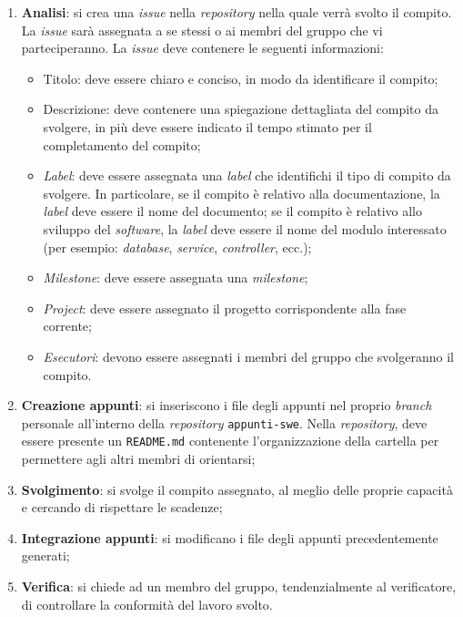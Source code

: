 \begin{enumerate}
	\item \textbf{Analisi}: si crea una \textit{issue\g} nella
	      \textit{repository\g} nella quale verrà svolto il compito. La
	      \textit{issue\g} sarà assegnata a se stessi o ai membri del gruppo che
	      vi parteciperanno. La \textit{issue\g} deve contenere le seguenti
	      informazioni:
	      \begin{itemize}
		      \item Titolo: deve essere chiaro e conciso, in modo da
		            identificare il compito;

		      \item Descrizione: deve contenere una spiegazione dettagliata
		            del compito da svolgere, in più deve essere indicato il
		            tempo stimato per il completamento del compito;

		      \item \textit{Label}: deve essere assegnata una \textit{label}
		            che identifichi il tipo di compito da svolgere. In
		            particolare, se il compito è relativo alla documentazione,
		            la \textit{label} deve essere il nome del documento; se il
		            compito è relativo allo sviluppo del \textit{software},
		            la \textit{label} deve essere il nome del modulo
		            interessato (per esempio: \textit{database},
		            \textit{service}, \textit{controller}, ecc.);

		      \item \textit{Milestone}: deve essere assegnata una
		            \textit{milestone};

		      \item \textit{Project}: deve essere assegnato il progetto
		            corrispondente alla fase corrente;

		      \item \textit{Esecutori}: devono essere assegnati i membri
		            del gruppo che svolgeranno il compito.
	      \end{itemize}


	\item \textbf{Creazione appunti}: si inseriscono i file degli
	      appunti nel proprio \textit{branch} personale all'interno
	      della \textit{repository\g} \texttt{appunti-swe}.
	      Nella \textit{repository\g}, deve essere presente un \texttt{README.md}
	      contenente l'organizzazione della cartella per permettere agli altri
	      membri di orientarsi;

	\item \textbf{Svolgimento}: si svolge il compito assegnato, al meglio
	      delle proprie capacità e cercando di rispettare le scadenze;

	\item \textbf{Integrazione appunti}: si modificano i file degli
	      appunti precedentemente generati;

	\item \textbf{Verifica}: si chiede ad un membro del gruppo,
	      tendenzialmente al verificatore, di controllare la conformità del
	      lavoro svolto.
\end{enumerate}

